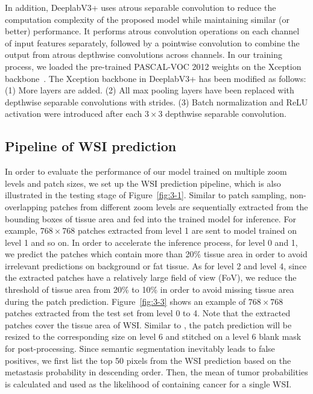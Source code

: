 In addition, DeeplabV3+ uses atrous separable convolution to reduce the computation complexity of the proposed model while maintaining similar (or better) performance. It performs atrous convolution operations on each channel of input features separately, followed by a pointwise convolution to combine the output from atrous depthwise convolutions across channels. In our training process, we loaded the pre-trained PASCAL-VOC 2012 weights on the Xception backbone~\cite{8099678}. The Xception backbone in DeeplabV3+ has been modified as follows: (1) More layers are added. (2) All max pooling layers have been replaced with depthwise separable convolutions with strides. (3) Batch normalization and ReLU activation were introduced after each $3 \times 3$ depthwise separable convolution.

\subsection{Pipeline of WSI prediction}\label{se:3-3.3}

In order to evaluate the performance of our model trained on multiple zoom levels and patch sizes, we set up the WSI prediction pipeline, which is also illustrated in the testing stage of Figure~\ref{fig:3-1}. Similar to patch sampling, non-overlapping patches from different zoom levels are sequentially extracted from the bounding boxes of tissue area and fed into the trained model for inference. For example, $768\times768$ patches extracted from level 1 are sent to model trained on level 1 and so on. In order to accelerate the inference process, for level 0 and 1, we predict the patches which contain more than 20\% tissue area in order to avoid irrelevant predictions on background or fat tissue. As for level 2 and level 4, since the extracted patches have a relatively large field of view (FoV), we reduce the threshold of tissue area from 20\% to 10\% in order to avoid missing tissue area during the patch prediction. Figure~\ref{fig:3-3} shows an example of $768\times768$ patches extracted from the test set from level 0 to 4. Note that the extracted patches cover the tissue area of WSI. Similar to \cite{Li2018}, the patch prediction will be resized to the corresponding size on level 6 and stitched on a level 6 blank mask for post-processing. Since semantic segmentation inevitably leads to false positives, we first list the top 50 pixels from the WSI prediction based on the metastasis probability in descending order. Then, the mean of tumor probabilities is calculated and used as the likelihood of containing cancer for a single WSI.

